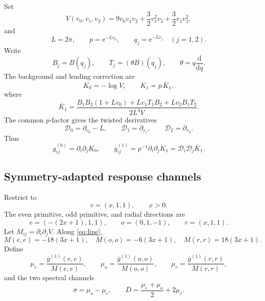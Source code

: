 \documentclass[11pt]{article}
\theoremstyle{definition}
\theoremstyle{remark}
\newcommand{\dd}{\mathrm{d}}
\newcommand{\e}{\mathrm{e}}
\newcommand{\bK}{\overline{K}}
\newcommand{\bg}{\overline{g}}
\newcommand{\bsigma}{\overline{\sigma}}
\newcommand{\bD}{\overline{D}}
\begin{document}
Set
\begin{equation}\label{eq:V}
 V(v_0,v_1,v_2)
 =9v_0v_1v_2+\frac32v_1^2v_2+\frac32v_1v_2^2,
\end{equation}
and
\begin{equation}\label{eq:Lpq}
 L=2\pi,
 \qquad p=\e^{-Lv_0},
 \qquad q_j=\e^{-Lv_j}\quad(j=1,2).
\end{equation}
Write
\[
 B_j=B(q_j),
 \qquad T_j=(\theta B)(q_j),
 \qquad \theta=q\frac{\dd}{\dd q}.
\]
The background and leading correction are
\begin{equation}\label{eq:K0K1}
 K_0=-\log V,
 \qquad
 K_1=p\,\bK_1,
\end{equation}
where
\begin{equation}\label{eq:K1bar}
 \bK_1=
 \frac{B_1B_2(1+Lv_0)+Lv_1T_1B_2+Lv_2B_1T_2}{2L^3V}.
\end{equation}
The common \(p\)-factor gives the twisted derivatives
\begin{equation}\label{eq:twisted}
 \mathscr D_0=\partial_{v_0}-L,
 \qquad
 \mathscr D_1=\partial_{v_1},
 \qquad
 \mathscr D_2=\partial_{v_2}.
\end{equation}
Thus
\begin{equation}\label{eq:gdefs}
 g^{(0)}_{ij}=\partial_i\partial_jK_0,
 \qquad
 \bg^{(1)}_{ij}=p^{-1}\partial_i\partial_jK_1
 =\mathscr D_i\mathscr D_j\bK_1.
\end{equation}

\subsection{Symmetry-adapted response channels}

Restrict to
\begin{equation}\label{eq:line}
 v=(x,1,1),\qquad x>0.
\end{equation}
The even primitive, odd primitive, and radial directions are
\begin{equation}\label{eq:directions}
 e=(-(2x+1),1,1),
 \qquad o=(0,1,-1),
 \qquad r=(x,1,1).
\end{equation}
Let \(M_{ij}=\partial_i\partial_jV\).  Along \eqref{eq:line},
\[
 M(e,e)=-18(3x+1),\quad
 M(o,o)=-6(3x+1),\quad
 M(r,r)=18(3x+1).
\]
Define
\begin{equation}\label{eq:mus}
 \mu_e=\frac{\bg^{(1)}(e,e)}{M(e,e)},
 \qquad
 \mu_o=\frac{\bg^{(1)}(o,o)}{M(o,o)},
 \qquad
 \mu_r=\frac{\bg^{(1)}(r,r)}{M(r,r)},
\end{equation}
and the two spectral channels
\begin{equation}\label{eq:channels}
 \bsigma=\mu_o-\mu_e,
 \qquad
 \bD=\frac{\mu_e+\mu_o}{2}+2\mu_r.
\end{equation}
\end{document}

